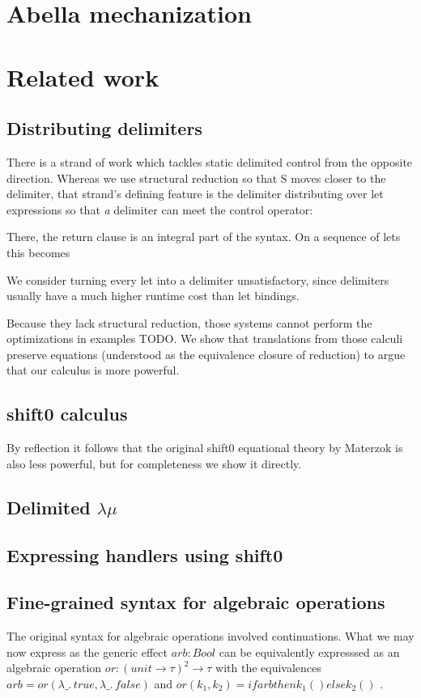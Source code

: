 \documentclass[a4paper, 11pt,titlepage, openright, twoside]{report}
\newcommand{\+}{\enspace}
\begin{document}
\chapter{Abella mechanization}

\chapter{Related work}


\section{Distributing delimiters}
There is a strand of work which tackles static delimited control from the opposite direction.
Whereas we use structural reduction so that S moves closer to the delimiter, that strand's defining feature is
the delimiter distributing over let expressions so that \textit{a} delimiter can meet the control operator:

There, the return clause is an integral part of the syntax. On a sequence of lets this becomes

We consider turning every let into a delimiter unsatisfactory, since delimiters usually have a much higher runtime cost than let bindings.

Because they lack structural reduction, those systems cannot perform the optimizations in examples TODO.
We show that translations from those calculi preserve equations (understood as the equivalence closure of reduction)
to argue that our calculus is more powerful.

\section{shift0 calculus}
By reflection\cite{ppdp21} it follows that the original shift0 equational theory by Materzok is also less powerful,
but for completeness we show it directly.

\section{Delimited \texorpdfstring{$λμ$}{lambda-mu}}

\section{Expressing handlers using shift0}

\section{Fine-grained syntax for algebraic operations}
The original syntax for algebraic operations involved continuations.
What we may now express as the generic effect $arb : Bool$
can be equivalently expresssed as an algebraic operation $or : (unit → τ)^2 → τ$
with the equivalences $arb = or(λ\_.\,true, λ\_.\,false)$ and
$or(k_1,k_2) = if arb then k_1 () else k_2 ()$ \cite{alggen}.
\end{document}
